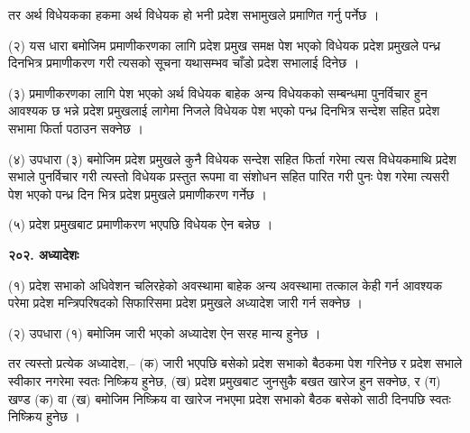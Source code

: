 तर अर्थ विधेयकका हकमा अर्थ विधेयक हो भनी प्रदेश सभामुखले प्रमाणित गर्नु पर्नेछ ।

(२) यस धारा बमोजिम प्रमाणीकरणका लागि प्रदेश प्रमुख समक्ष पेश भएको विधेयक प्रदेश प्रमुखले पन्ध्र दिनभित्र प्रमाणीकरण गरी त्यसको सूचना यथासम्भव चाँडो प्रदेश सभालाई दिनेछ ।

(३) प्रमाणीकरणका लागि पेश भएको अर्थ विधेयक बाहेक अन्य विधेयकको सम्बन्धमा पुनर्विचार हुन आवश्यक छ भन्ने प्रदेश प्रमुखलाई
लागेमा निजले विधेयक पेश भएको पन्ध्र दिनभित्र सन्देश सहित प्रदेश सभामा फिर्ता पठाउन सक्नेछ ।

(४) उपधारा (३) बमोजिम प्रदेश प्रमुखले कुनै विधेयक सन्देश सहित फिर्ता गरेमा त्यस विधेयकमाथि प्रदेश सभाले पुनर्विचार गरी त्यस्तो विधेयक प्रस्तुत रूपमा वा संशोधन सहित पारित गरी पुनः पेश गरेमा त्यसरी पेश भएको पन्ध्र दिन भित्र प्रदेश प्रमुखले प्रमाणीकरण गर्नेछ ।

(५) प्रदेश प्रमुखबाट प्रमाणीकरण भएपछि विधेयक ऐन बन्नेछ ।

\textbf{२०२. अध्यादेशः}

(१) प्रदेश सभाको अधिवेशन चलिरहेको अवस्थामा बाहेक अन्य अवस्थामा तत्काल केही गर्न आवश्यक परेमा प्रदेश मन्त्रिपरिषदको
सिफारिसमा प्रदेश प्रमुखले अध्यादेश जारी गर्न सक्नेछ ।

(२) उपधारा (१) बमोजिम जारी भएको अध्यादेश ऐन सरह मान्य हुनेछ ।

तर त्यस्तो प्रत्येक अध्यादेश,–
(क) जारी भएपछि बसेको प्रदेश सभाको बैठकमा पेश गरिनेछ र प्रदेश सभाले स्वीकार नगरेमा स्वतः निष्क्रिय हुनेछ,
(ख) प्रदेश प्रमुखबाट जुनसुकै बखत खारेज हुन सक्नेछ, र
(ग) खण्ड (क) वा (ख) बमोजिम निष्क्रिय वा खारेज नभएमा प्रदेश सभाको बैठक बसेको साठी दिनपछि स्वतः निष्क्रिय हुनेछ ।